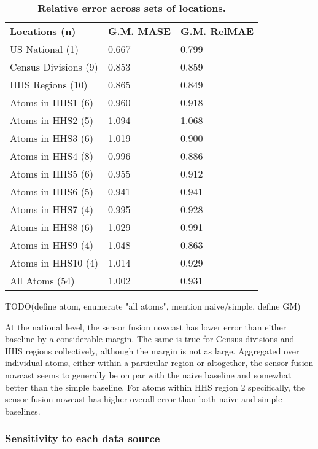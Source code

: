 \documentclass[10pt,letterpaper]{article}
\newlength\savedwidth
\newcommand\thickhline{\noalign{\global\savedwidth\arrayrulewidth\global\arrayrulewidth 2pt}%
\hline
\noalign{\global\arrayrulewidth\savedwidth}}
\begin{document}
\begin{table}[!ht]
  \centering
  \caption{{\bf Relative error across sets of locations.}}
  \begin{tabular}{|l|l|l|}
    \hline
    {\bf Locations (n)} & {\bf G.M. MASE} & {\bf G.M. RelMAE}\\ \thickhline
    US National (1) & 0.667 & 0.799 \\ \hline
    Census Divisions (9) & 0.853 & 0.859 \\ \hline
    HHS Regions (10) & 0.865 & 0.849 \\ \hline
    Atoms in HHS1 (6) & 0.960 & 0.918 \\ \hline
    Atoms in HHS2 (5) & 1.094 & 1.068 \\ \hline
    Atoms in HHS3 (6) & 1.019 & 0.900 \\ \hline
    Atoms in HHS4 (8) & 0.996 & 0.886 \\ \hline
    Atoms in HHS5 (6) & 0.955 & 0.912 \\ \hline
    Atoms in HHS6 (5) & 0.941 & 0.941 \\ \hline
    Atoms in HHS7 (4) & 0.995 & 0.928 \\ \hline
    Atoms in HHS8 (6) & 1.029 & 0.991 \\ \hline
    Atoms in HHS9 (4) & 1.048 & 0.863 \\ \hline
    Atoms in HHS10 (4) & 1.014 & 0.929 \\ \hline
    All Atoms (54) & 1.002 & 0.931 \\ \hline
  \end{tabular}
  \begin{flushleft}
    TODO(define atom, enumerate "all atoms", mention naive/simple, define GM)
  \end{flushleft}
  \label{table_relative_metrics}
\end{table}

At the national level, the sensor fusion nowcast has lower error than either
baseline by a considerable margin. The same is true for Census divisions and
HHS regions collectively, although the margin is not as large. Aggregated over
individual atoms, either within a particular region or altogether, the sensor
fusion nowcast seems to generally be on par with the naive baseline and
somewhat better than the simple baseline. For atoms within HHS region 2
specifically, the sensor fusion nowcast has higher overall error than both
naive and simple baselines.

\subsubsection*{Sensitivity to each data source}
\end{document}
